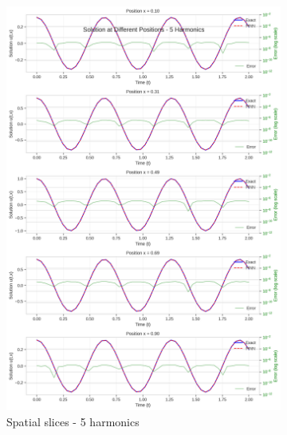 \begin{figure}[H]
    \centering
    \begin{subfigure}[b]{0.48\textwidth}
        \centering
        \includegraphics[width=\textwidth]{figures/space_slices_5h.png}
        \caption{Spatial slices - 5 harmonics}
    \end{subfigure}
    \hfill
    \begin{subfigure}[b]{0.48\textwidth}
        \centering

\end{subfigure}
\end{figure}
